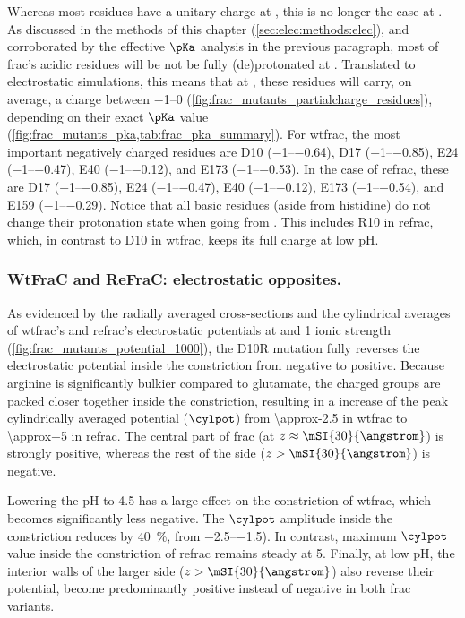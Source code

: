 Whereas most residues have a unitary charge at , this is no longer the case at . As discussed
in the methods of this chapter (\cref{sec:elec:methods:elec}), and corroborated by the effective $\pKa$
analysis in the previous paragraph, most of \gls{frac}'s acidic residues will be not be fully (de)protonated
at . Translated to electrostatic simulations, this means that at , these residues will carry,
on average, a charge between \SIrange{-1}{0}{\ec} (\cref{fig:frac_mutants_partialcharge_residues}), depending
on their exact $\pKa$ value (\cref{fig:frac_mutants_pka,tab:frac_pka_summary}). For \gls{wtfrac}, the most
important negatively charged residues are D10 (\SIrange{-1}{-0.64}{\ec}), D17 (\SIrange{-1}{-0.85}{\ec}), E24
(\SIrange{-1}{-0.47}{\ec}), E40 (\SIrange{-1}{-0.12}{\ec}), and E173 (\SIrange{-1}{-0.53}{\ec}). In the case
of \gls{refrac}, these are D17 (\SIrange{-1}{-0.85}{\ec}), E24 (\SIrange{-1}{-0.47}{\ec}), E40
(\SIrange{-1}{-0.12}{\ec}), E173 (\SIrange{-1}{-0.54}{\ec}), and E159 (\SIrange{-1}{-0.29}{\ec}). Notice that
all basic residues (aside from histidine) do not change their protonation state when going from
. This includes R10 in \gls{refrac}, which, in contrast to D10 in \gls{wtfrac}, keeps its
full charge at low pH.

\subsubsection{WtFraC and ReFraC: electrostatic opposites.}
%

As evidenced by the radially averaged cross-sections and the cylindrical averages of \gls{wtfrac}'s and
\gls{refrac}'s electrostatic potentials at  and \SI{1}{\Molar} ionic strength
(\cref{fig:frac_mutants_potential_1000}), the D10R mutation fully reverses the electrostatic potential inside
the constriction from negative to positive. Because arginine is significantly bulkier compared to glutamate,
the charged groups are packed closer together inside the constriction, resulting in a increase of the peak
cylindrically averaged potential ($\cylpot$) from \SI{\approx-2.5}{\kTe} in \gls{wtfrac} to
\SI[retain-explicit-plus]{\approx+5}{\kTe} in \gls{refrac}. The central part of \gls{frac} (at $z \approx
\mSI{30}{\angstrom}$) is strongly positive, whereas the rest of the \cisi{} side ($z > \mSI{30}{\angstrom}$)
is negative.

Lowering the pH to \num{4.5} has a large effect on the constriction of \gls{wtfrac}, which becomes
significantly less negative. The $\cylpot$ amplitude inside the constriction reduces by \SI{40}{\percent},
from \SIrange{-2.5}{-1.5}{\kTe}). In contrast, maximum $\cylpot$ value inside the constriction of \gls{refrac}
remains steady at \SI[retain-explicit-plus]{+5}{\kTe}. Finally, at low pH, the interior walls of the larger
\cisi{} side ($z > \mSI{30}{\angstrom}$) also reverse their potential, become predominantly positive instead
of negative in both \gls{frac} variants.

